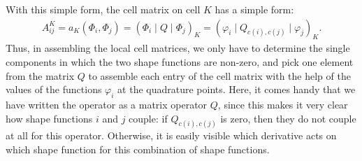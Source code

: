 \documentclass{article}
\begin{document}
With this simple form, the cell matrix on cell $K$ has a simple form:
\begin{gather*}
  A^K_{ij}
  =
  a_K(\Phi_i,\Phi_j)
  =
  \left(\Phi_i \mid Q \mid \Phi_j \right)_K
  =
  \left(\varphi_i \mid Q_{c(i),c(j)} \mid \varphi_j \right)_K.
\end{gather*}
Thus, in assembling the local cell matrices, we only have to determine the
single components in which the two shape functions are non-zero, and 
pick one element from the matrix $Q$ to assemble each entry of the cell
matrix with the help of the values of the functions $\varphi_i$ at the
quadrature points. Here, it comes handy that we have written the operator as a
matrix operator $Q$, since this makes it very clear how shape functions $i$
and $j$ couple: if $Q_{c(i),c(j)}$ is zero, then they do not couple at all for
this operator. Otherwise, it is easily visible which derivative acts on which
shape function for this combination of shape functions.
\end{document}
